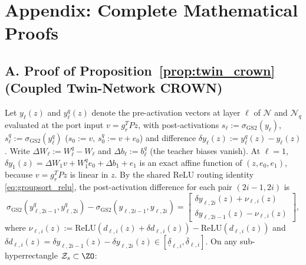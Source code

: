 \appendix
\section*{Appendix: Complete Mathematical Proofs}

\subsection*{A. Proof of Proposition~\ref{prop:twin_crown} (Coupled Twin-Network CROWN)}
Let \(y_\ell(z)\) and \(y_\ell^q(z)\) denote the pre-activation vectors at layer \(\ell\) of \(\mathcal{N}\) and \(\mathcal{N}_q\) evaluated at the port input \(v = g_r^TPz\), with post-activations \(s_\ell := \sigma_{\mathrm{GS2}}(y_\ell)\), \(s_\ell^q := \sigma_{\mathrm{GS2}}(y_\ell^q)\) (\(s_0 := v\), \(s_0^q := v + e_0\)) and difference \(\delta y_\ell(z) := y_\ell^q(z) - y_\ell(z)\). Write \(\Delta W_\ell := W_\ell^q - W_\ell\) and \(\Delta b_\ell := b_\ell^q\) (the teacher biases vanish). At \(\ell = 1\),
\(\delta y_1(z) = \Delta W_1 v + W_1^q e_0 + \Delta b_1 + e_1\) is an exact affine function of \((z, e_0, e_1)\), because \(v = g_r^TPz\) is linear in \(z\). By the shared ReLU routing identity \eqref{eq:groupsort_relu}, the post-activation difference for each pair \((2i-1, 2i)\) is
\begin{equation}
\label{eq:gs2_diff_pair}
\sigma_{\mathrm{GS2}}(y_{\ell,2i-1}^q, y_{\ell,2i}^q) - \sigma_{\mathrm{GS2}}(y_{\ell,2i-1}, y_{\ell,2i}) = \begin{bmatrix} \delta y_{\ell,2i}(z) + \nu_{\ell,i}(z) \\ \delta y_{\ell,2i-1}(z) - \nu_{\ell,i}(z) \end{bmatrix},
\end{equation}
where \(\nu_{\ell,i}(z) := \mathrm{ReLU}(d_{\ell,i}(z) + \delta d_{\ell,i}(z)) - \mathrm{ReLU}(d_{\ell,i}(z))\) and \(\delta d_{\ell,i}(z) = \delta y_{\ell,2i-1}(z) - \delta y_{\ell,2i}(z) \in [\underline{\delta}_{\ell,i}, \overline{\delta}_{\ell,i}]\). On any sub-hyperrectangle \(\mathcal{Z}_s \subset \ZO\):
